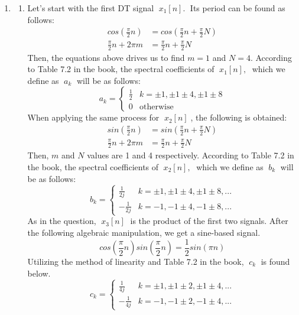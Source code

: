 \documentclass[10pt,a4paper, margin=1in]{article}
\begin{document}
\begin{enumerate}
\item %
    \begin{enumerate}
    \item %
    Let's start with the first DT signal $\; x_1[n]. \;$ Its period can be found as follows:
        \begin{align*}
            cos(\frac{\pi}{2}n) &= cos(\frac{\pi}{2}n+\frac{\pi}{2}N) \\ 
            \frac{\pi}{2}n+2\pi m &= \frac{\pi}{2}n+\frac{\pi}{2}N
        \end{align*}
    Then, the equations above drives us to find $m=1$ and $N=4$. According to Table 7.2 in the book, the spectral coefficients of $\; x_1[n], \;$ which we define as $\; a_k \;$ will be as follows:
    $$a_k = 
        \begin{cases}
            \frac{1}{2} & k=\pm 1, \pm 1 \pm 4, \pm 1 \pm 8\\
            0 & \text{otherwise}
        \end{cases}
    $$
    When applying the same process for $\; x_2[n] \;$, the following is obtained:
        \begin{align*}
            sin(\frac{\pi}{2}n) &= sin(\frac{\pi}{2}n+\frac{\pi}{2}N) \\ 
            \frac{\pi}{2}n+2\pi m &= \frac{\pi}{2}n+\frac{\pi}{2}N
        \end{align*}
    Then, $m$ and $N$ values are 1 and 4 respectively. According to Table 7.2 in the book, the spectral coefficients of $\; x_2[n], \;$ which we define as $\; b_k \;$ will be as follows:
    $$b_k = 
        \begin{cases}
             \frac{1}{2j} & k=\pm 1, \pm 1 \pm 4, \pm 1 \pm 8, ...\\
            -\frac{1}{2j} & k=-1, -1 \pm 4, -1 \pm 8, ...
        \end{cases}
    $$
    As in the question, $\; x_3[n] \;$ is the product of the first two signals. After the following algebraic manipulation, we get a sine-based signal.
    $$cos(\frac{\pi}{2}n)sin(\frac{\pi}{2}n) = \frac{1}{2}sin(\pi n)$$
    Utilizing the method of linearity and Table 7.2 in the book, $\; c_k \;$ is found below.
    $$c_k = 
        \begin{cases}
            \frac{1}{4j} & k=\pm 1, \pm 1 \pm 2, \pm 1 \pm 4, ...\\
            -\frac{1}{4j} & k=-1, -1 \pm 2, -1 \pm 4, ...
        \end{cases}
    $$\vspace{0.3cm}\\
    

\end{enumerate}
\end{enumerate}
\end{document}

